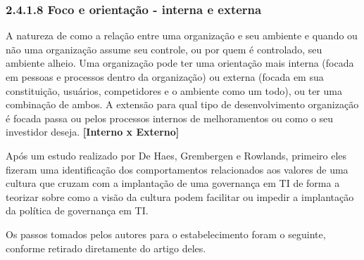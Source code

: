     \subsubsection{2.4.1.8 Foco e orientação - interna e externa}
    A natureza de como a relação entre uma organização e seu ambiente e quando ou não uma organização assume seu controle, ou por quem é controlado, seu ambiente alheio. Uma organização pode ter uma orientação mais interna (focada em pessoas e processos dentro da organização) ou externa (focada em sua constituição, usuários, competidores e o ambiente como um todo), ou ter uma combinação de ambos. A extensão para qual tipo de desenvolvimento organização é focada passa ou pelos processos internos de melhoramentos ou como o seu investidor deseja. {\bf [Interno x Externo]}
    
Após um estudo realizado por De Haes, Grembergen e Rowlands\cite{exploringit}, primeiro eles fizeram uma identificação dos comportamentos relacionados aos valores de uma cultura que cruzam com a implantação de uma governança em TI de forma a teorizar sobre como a visão da cultura podem facilitar ou impedir a implantação da política de governança em TI.

Os passos tomados pelos autores para o estabelecimento foram o seguinte, conforme retirado diretamente do artigo deles.


